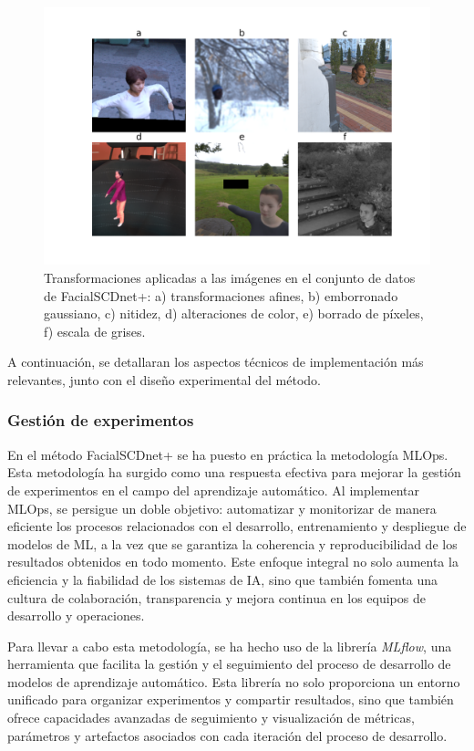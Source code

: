 \begin{figure}[h]
	\centering
	\includegraphics[scale=0.4]{imagenes/cap4/augmented_images.png}
	\caption[Transformaciones utilizadas en el aumento de datos.]{Transformaciones aplicadas a las imágenes en el conjunto de datos de FacialSCDnet+: a) transformaciones afines, b) emborronado gaussiano, c) nitidez, d) alteraciones de color, e) borrado de píxeles, f) escala de grises.}
	\label{fig25}
\end{figure}

A continuación, se detallaran los aspectos técnicos de implementación más relevantes, junto con el diseño experimental del método.

\subsubsection{Gestión de experimentos}

En el método FacialSCDnet+ se ha puesto en práctica la metodología MLOps. Esta metodología ha surgido como una respuesta efectiva para mejorar la gestión de experimentos en el campo del aprendizaje automático. Al implementar MLOps, se persigue un doble objetivo: automatizar y monitorizar de manera eficiente los procesos relacionados con el desarrollo, entrenamiento y despliegue de modelos de ML, a la vez que se garantiza la coherencia y reproducibilidad de los resultados obtenidos en todo momento. Este enfoque integral no solo aumenta la eficiencia y la fiabilidad de los sistemas de IA, sino que también fomenta una cultura de colaboración, transparencia y mejora continua en los equipos de desarrollo y operaciones.

Para llevar a cabo esta metodología, se ha hecho uso de la librería \textit{MLflow}, una herramienta que facilita la gestión y el seguimiento del proceso de desarrollo de modelos de aprendizaje automático. Esta librería no solo proporciona un entorno unificado para organizar experimentos y compartir resultados, sino que también ofrece capacidades avanzadas de seguimiento y visualización de métricas, parámetros y artefactos asociados con cada iteración del proceso de desarrollo.

